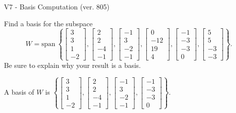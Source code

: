 \begin{exercise}
  \begin{exerciseTitle}V7 - Basis Computation (ver. 805)\end{exerciseTitle}
  \begin{exerciseStatement}
    Find a basis for the subspace 
\[W=\mathrm{span}\ \left\{\left[\begin{array}{r}
3 \\
3 \\
1 \\
-2
\end{array}\right] , \left[\begin{array}{r}
2 \\
2 \\
-4 \\
-1
\end{array}\right] , \left[\begin{array}{r}
-1 \\
3 \\
-2 \\
-1
\end{array}\right] , \left[\begin{array}{r}
0 \\
-12 \\
19 \\
4
\end{array}\right] , \left[\begin{array}{r}
-1 \\
-3 \\
-3 \\
0
\end{array}\right] , \left[\begin{array}{r}
5 \\
5 \\
-3 \\
-3
\end{array}\right]\right\}.\]
 Be sure to explain why your result is a basis.


  \end{exerciseStatement}
  \begin{exerciseAnswer}
   A basis of \(W\) is  \(\left\{\left[\begin{array}{r}
3 \\
3 \\
1 \\
-2
\end{array}\right] , \left[\begin{array}{r}
2 \\
2 \\
-4 \\
-1
\end{array}\right] , \left[\begin{array}{r}
-1 \\
3 \\
-2 \\
-1
\end{array}\right] , \left[\begin{array}{r}
-1 \\
-3 \\
-3 \\
0
\end{array}\right]\right\}\).
  


  \end{exerciseAnswer}
\end{exercise}